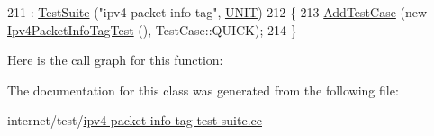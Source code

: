 \begin{DoxyCode}
211   : \hyperlink{classns3_1_1TestSuite_a904b0c40583b744d30908aeb94636d1a}{TestSuite} (\textcolor{stringliteral}{"ipv4-packet-info-tag"}, \hyperlink{classns3_1_1TestSuite_a1ebfcab34ec8161e085e8e3a1855eae0a3885375a3787abf60431f8454b3cadbd}{UNIT})
212 \{
213   \hyperlink{classns3_1_1TestCase_a3718088e3eefd5d6454569d2e0ddd835}{AddTestCase} (\textcolor{keyword}{new} \hyperlink{classIpv4PacketInfoTagTest}{Ipv4PacketInfoTagTest} (), TestCase::QUICK);
214 \}
\end{DoxyCode}


Here is the call graph for this function\+:




The documentation for this class was generated from the following file\+:\begin{DoxyCompactItemize}
\item 
internet/test/\hyperlink{ipv4-packet-info-tag-test-suite_8cc}{ipv4-\/packet-\/info-\/tag-\/test-\/suite.\+cc}\end{DoxyCompactItemize}
